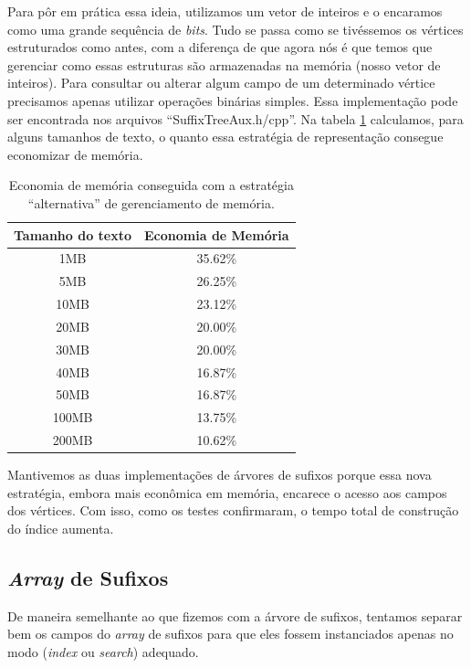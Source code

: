 \documentclass[]{article}
\begin{document}
Para pôr em prática essa ideia, utilizamos um vetor de inteiros e o encaramos como uma grande sequência de \textit{bits}. Tudo se passa como se tivéssemos os vértices estruturados como antes, com a diferença de que agora nós é que temos que gerenciar como essas estruturas são armazenadas na memória (nosso vetor de inteiros). Para consultar ou alterar algum campo de um determinado vértice precisamos apenas utilizar operações binárias simples. Essa implementação pode ser encontrada nos arquivos ``SuffixTreeAux.h/cpp''. Na tabela \ref{tab:t1} calculamos, para alguns tamanhos de texto, o quanto essa estratégia de representação consegue economizar de memória.

\begin{table}
	\begin{center}
		\begin{tabular}{c|c}
			Tamanho do texto & Economia de Memória\\
			\hline
			1MB & 35.62\% \\
			5MB & 26.25\% \\
			10MB & 23.12\% \\
			20MB & 20.00\% \\
			30MB & 20.00\% \\
			40MB & 16.87\% \\
			50MB & 16.87\% \\
			100MB & 13.75\% \\
			200MB & 10.62\% \\
		\end{tabular}
		\caption{Economia de memória conseguida com a estratégia ``alternativa'' de gerenciamento de memória.}
		\label{tab:t1}
	\end{center}
\end{table}

Mantivemos as duas implementações de árvores de sufixos porque essa nova estratégia, embora mais econômica em memória, encarece o acesso aos campos dos vértices. Com isso, como os testes confirmaram, o tempo total de construção do índice aumenta.

\subsection{\textit{Array} de Sufixos}

De maneira semelhante ao que fizemos com a árvore de sufixos, tentamos separar bem os campos do \textit{array} de sufixos para que eles fossem instanciados apenas no modo (\textit{index} ou \textit{search}) adequado.
\end{document}
